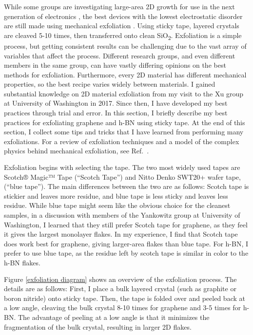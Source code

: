 \documentclass[double,12pt,1in,seploa]{beavtex}
\begin{document}
While some groups are investigating large-area 2D growth for use in the next generation of electronics \cite{quellmalz_large-area_2021}, the best devices with the lowest electrostatic disorder are still made using mechanical exfoliation \cite{xin_giant_2023}. Using sticky tape, layered crystals are cleaved 5-10 times, then transferred onto clean SiO\textsubscript{2}. Exfoliation is a simple process, but getting consistent results can be challenging due to the vast array of variables that affect the process. Different research groups, and even different members in the same group, can have vastly differing opinions on the best methods for exfoliation. Furthermore, every 2D material has different mechanical properties, so the best recipe varies widely between materials. I gained substantial knowledge on 2D material exfoliation from my visit to the Xu group at University of Washington in 2017. Since then, I have developed my best practices through trial and error. In this section, I briefly describe my best practices for exfoliating graphene and h-BN using sticky tape. At the end of this section, I collect some tips and tricks that I have learned from performing many exfoliations. For a review of exfoliation techniques and a model of the complex physics behind mechanical exfoliation, see Ref.\ \cite{islam_exfoliation_2022}.



Exfoliation begins with selecting the tape. The two most widely used tapes are Scotch® Magic™ Tape (“Scotch Tape”) and Nitto Denko SWT20+ wafer tape, (“blue tape”). The main differences between the two are as follows: Scotch tape is stickier and leaves more residue, and blue tape is less sticky and leaves less residue. While blue tape might seem like the obvious choice for the cleanest samples, in a discussion with members of the Yankowitz group at University of Washington, I learned that they still prefer Scotch tape for graphene, as they feel it gives the largest monolayer flakes. In my experience, I find that Scotch tape does work best for graphene, giving larger-area flakes than blue tape. For h-BN, I prefer to use blue tape, as the residue left by scotch tape is similar in color to the h-BN flakes.

Figure \ref{exfoliation diagram} shows an overview of the exfoliation process. The details are as follows: First, I place a bulk layered crystal (such as graphite or boron nitride) onto sticky tape. Then, the tape is folded over and peeled back at a low angle, cleaving the bulk crystal 8-10 times for graphene and 3-5 times for h-BN. The advantage of peeling at a low angle is that it minimizes the fragmentation of the bulk crystal, resulting in larger 2D flakes.
\end{document}
